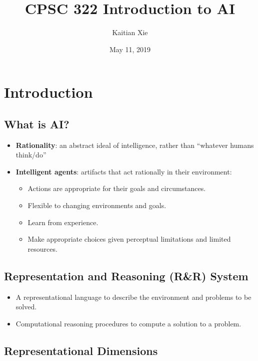 \documentclass{article}
\title{CPSC 322 Introduction to AI}
\author{Kaitian Xie}
\date{May 11, 2019}
\begin{document}
\maketitle
\pagebreak

\tableofcontents
\pagebreak

\section{Introduction}

\subsection{What is AI?}

\begin{itemize}
    \item \textbf{Rationality}: an abstract ideal of intelligence, rather than ``whatever humans think/do''
    \item \textbf{Intelligent agents}: artifacts that act rationally in their environment:
        \begin{itemize}
            \item Actions are appropriate for their goals and circumstances.
            \item Flexible to changing environments and goals.
            \item Learn from experience.
            \item Make appropriate choices given perceptual limitations and limited resources.
        \end{itemize}
\end{itemize}

\subsection{Representation and Reasoning (R\&R) System}

\begin{itemize}
    \item A representational language to describe the environment and problems to be solved.
    \item Computational reasoning procedures to compute a solution to a problem.
\end{itemize}

\subsection{Representational Dimensions}
\end{document}
